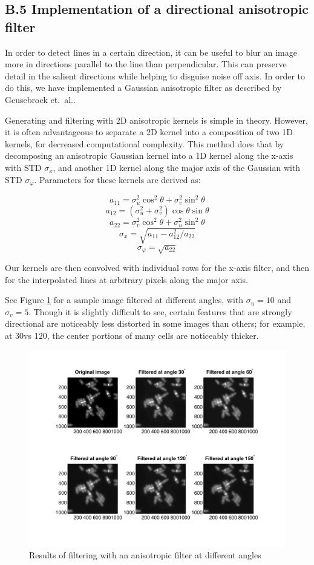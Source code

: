 \documentclass{article}
\begin{document}
\subsection*{B.5 Implementation of a directional anisotropic filter}

In order to detect lines in a certain direction, it can be useful to blur an image more in directions parallel to the line than perpendicular. This can preserve detail in the salient directions while helping to disguise noise off axis. In order to do this, we have implemented a Gaussian anisotropic filter as described by Geusebroek et.\ al.\cite{geusebroek}.

Generating and filtering with 2D anisotropic kernels is simple in theory. However, it is often advantageous to separate a 2D kernel into a composition of two 1D kernels, for decreased computational complexity. This method does that by decomposing an anisotropic Gaussian kernel into a 1D kernel along the x-axis with STD $\sigma_x$, and another 1D kernel along the major axis of the Gaussian with STD $\sigma_\varphi$. Parameters for these kernels are derived as:

\[ a_{11} = \sigma_u^2 \cos^2 \theta + \sigma_v^2 \sin^2 \theta \]
\[ a_{12} = (\sigma_u^2 + \sigma_v^2)\cos\theta \sin\theta \]
\[ a_{22} = \sigma_v^2 \cos^2 \theta + \sigma_u^2 \sin^2 \theta \]
\[ \sigma_x = \sqrt{a_{11} - a_{12}^2/a_{22}} \]
\[ \sigma_\varphi = \sqrt{a_{22}} \]

Our kernels are then convolved with individual rows for the x-axis filter, and then for the interpolated lines at arbitrary pixels along the major axis.

See Figure \ref{fig:anisotropic_filtering} for a sample image filtered at different angles, with $\sigma_u = 10$ and $\sigma_v = 5$. Though it is slightly difficult to see, certain features that are strongly directional are noticeably less distorted in some images than others; for example, at 30\degree vs 120\degree, the center portions of many cells are noticeably thicker.

\begin{figure}[h]
\centering
\includegraphics[width=0.95\linewidth]{figures/anisotropic_filtering.pdf}
\caption{Results of filtering with an anisotropic filter at different angles}
\label{fig:anisotropic_filtering}
\end{figure}
\end{document}
